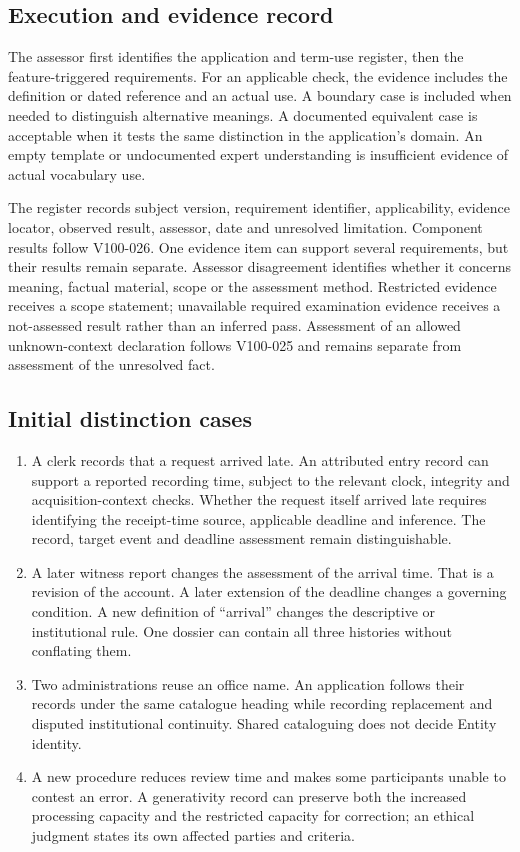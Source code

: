 \documentclass[11pt,a4paper]{article}
\begin{document}
\subsection{Execution and evidence record}
The assessor first identifies the application and term-use register, then the feature-triggered requirements. For an applicable check, the evidence includes the definition or dated reference and an actual use. A boundary case is included when needed to distinguish alternative meanings. A documented equivalent case is acceptable when it tests the same distinction in the application's domain. An empty template or undocumented expert understanding is insufficient evidence of actual vocabulary use.

The register records subject version, requirement identifier, applicability, evidence locator, observed result, assessor, date and unresolved limitation. Component results follow V100-026. One evidence item can support several requirements, but their results remain separate. Assessor disagreement identifies whether it concerns meaning, factual material, scope or the assessment method. Restricted evidence receives a scope statement; unavailable required examination evidence receives a not-assessed result rather than an inferred pass. Assessment of an allowed unknown-context declaration follows V100-025 and remains separate from assessment of the unresolved fact.


\subsection{Initial distinction cases}

\begin{enumerate}
\item A clerk records that a request arrived late. An attributed entry record can support a reported recording time, subject to the relevant clock, integrity and acquisition-context checks. Whether the request itself arrived late requires identifying the receipt-time source, applicable deadline and inference. The record, target event and deadline assessment remain distinguishable.
\item A later witness report changes the assessment of the arrival time. That is a revision of the account. A later extension of the deadline changes a governing condition. A new definition of ``arrival'' changes the descriptive or institutional rule. One dossier can contain all three histories without conflating them.
\item Two administrations reuse an office name. An application follows their records under the same catalogue heading while recording replacement and disputed institutional continuity. Shared cataloguing does not decide Entity identity.
\item A new procedure reduces review time and makes some participants unable to contest an error. A generativity record can preserve both the increased processing capacity and the restricted capacity for correction; an ethical judgment states its own affected parties and criteria.
\end{enumerate}
\end{document}
